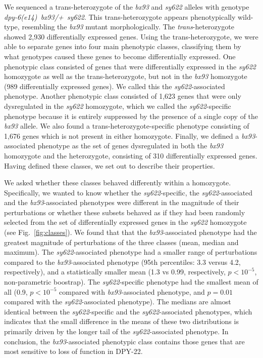\documentclass[10pt, onecolumn]{article}
\newcommand{\gene}[1]{\mbox{\emph{#1}}}
\newcommand{\protein}[1]{\mbox{\uppercase{#1}}}
\newcommand{\transn}{2,930}
\begin{document}
We sequenced a trans-heterozygote of the \emph{bx93} and \emph{sy622} alleles
with genotype \gene{dpy-6(e14) bx93/+ sy622}. This trans-heterozygote appears
phenotypically wild-type, resembling the \emph{bx93} mutant morphologically. The
\emph{trans}-heterozygote showed \transn{} differentially expressed genes. Using
the trans-heterozygote, we were able to separate genes into four main phenotypic
classes, classifying them by what genotypes caused these genes to become
differentially expressed. One phenotypic class consisted of genes that were
differentially expressed in the \emph{sy622} homozygote as well as the
trans-heterozygote, but not in the \emph{bx93} homozygote (989 differentially
expressed genes). We called this the \emph{sy622}-associated phenotype. Another
phenotypic class consisted of 1,623 genes that were only dysregulated in the
\emph{sy622} homozygote, which we called the \emph{sy622}-specific phenotype
because it is entirely suppressed by the presence of a single copy of the
\emph{bx93} allele. We also found a trans-heterozygote-specific phenotype
consisting of 1,676 genes which is not present in either homozygote. Finally, we
defined a \emph{bx93}-associated phenotype as the set of genes dysregulated in
both the \emph{bx93} homozygote and the heterozygote, consisting of 310
differentially expressed genes. Having defined these classes, we set out to
describe their properties.

We asked whether these classes behaved differently within a homozygote.
Specifically, we wanted to know whether the \emph{sy622}-specific, the
\emph{sy622}-associated and the \emph{bx93}-associated phenotypes were different
in the magnitude of their perturbations or whether these subsets behaved as if
they had been randomly selected from the set of differentially expressed genes
in the \emph{sy622} homozygote (see Fig.~\ref{fig:classes}). We found that that
the \emph{bx93}-associated phenotype had the greatest magnitude of perturbations
of the three classes (mean, median and maximum). The \emph{sy622}-associated
phenotype had a smaller range of perturbations compared to the
\emph{bx93}-associated phenotype (95th percentiles: 3.3 versus 4.2,
respectively), and a statistically smaller mean (1.3 vs 0.99, respectively, $p <
10^{-5}$, non-parametric boostrap). The \emph{sy622}-specific phenotype had the
smallest mean of all (0.9, $p < 10^{-5}$ compared with \emph{bx93}-associated
phenotype, and $p = 0.01$ compared with the \emph{sy622}-associated phenotype).
The medians are almost identical between the \emph{sy622}-specific and the
\emph{sy622}-associated phenotypes, which indicates that the small difference in
the means of these two distributions is primarily driven by the longer tail of
the \emph{sy622}-associated phenotype. In conclusion, the \emph{bx93}-associated
phenotypic class contains those genes that are most sensitive to loss of function
in \protein{dpy-22}.
\end{document}
